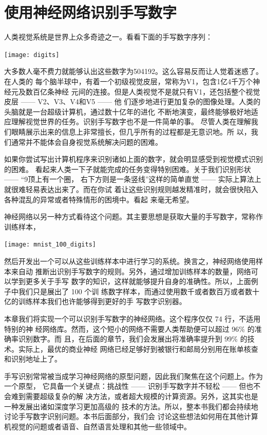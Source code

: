 
\chapter{使用神经网络识别手写数字}
\label{ch:UsingNeuralNetsToRecognizeHandwrittenDigits}

人类视觉系统是世界上众多奇迹之一。看看下面的手写数字序列：
\begin{center}
  \texttt{[image: digits]}\label{fig:digits}
\end{center}

大多数人毫不费力就能够认出这些数字为504192。这么容易反而让人觉着迷惑了。在人类的
每个脑半球中，有着一个初级视觉皮层，常称为V1，包含1亿4千万个神经元及数百亿条神经
元间的连接。但是人类视觉不是就只有V1，还包括整个视觉皮层 —— V2、V3、V4和V5 —— 他
们逐步地进行更加复杂的图像处理。人类的头脑就是一台超级计算机，通过数十亿年的进化
不断地演变，最终能够极好地适应理解视觉世界的任务。识别手写数字也不是一件简单的事。
尽管人类在理解我们眼睛展示出来的信息上非常擅长，但几乎所有的过程都是无意识地。所
以，我们通常并不能体会自身视觉系统解决问题的困难。

如果你尝试写出计算机程序来识别诸如上面的数字，就会明显感受到视觉模式识别的困难。
看起来人类一下子就能完成的任务变得特别困难。关于我们识别形状 —— ``9顶上有一个圈，
右下方则是一条竖线''这样的简单直觉 —— 实际上算法上就很难轻易表达出来了。而在你试
着让这些识别规则越发精准时，就会很快陷入各种混乱的异常或者特殊情形的困境中。看起
来毫无希望。

神经网络以另一种方式看待这个问题。其主要思想是获取大量的手写数字，常称作训练样本，
\begin{center}
  \texttt{[image: mnist\_100\_digits]}
\end{center}

然后开发出一个可以从这些训练样本中进行学习的系统。换言之，神经网络使用样本来自动
推断出识别手写数字的规则。另外，通过增加训练样本的数量，网络可以学到更多关于手写
数字的知识，这样就能够提升自身的准确性。所以，上面例子中我们只是展出了 100 个训
练数字样本，而通过使用数千或者数百万或者数十亿的训练样本我们也许能够得到更好的手
写数字识别器。

本章我们将实现一个可以识别手写数字的神经网络。这个程序仅仅 74 行，不适用特别的神
经网络库。然而，这个短小的网络不需要人类帮助便可以超过 96\% 的准确率识别数字。而
且，在后面的章节，我们会发展出将准确率提升到 99\% 的技术。实际上，最优的商业神经
网络已经足够好到被银行和邮局分别用在账单核查和识别地址上了。

手写识别常常被当成学习神经网络的原型问题，因此我们聚焦在这个问题上。作为一个原型，
它具备一个关键点：挑战性 —— 识别手写数字并不轻松 —— 但也不会难到需要超级复杂的解
决方法，或者超大规模的计算资源。另外，这其实也是一种发展出诸如深度学习更加高级的
技术的方法。所以，整本书我们都会持续地讨论手写数字识别问题。本书后面部分，我们会
讨论这些想法如何用在其他计算机视觉的问题或者语音、自然语言处理和其他一些领域中。

